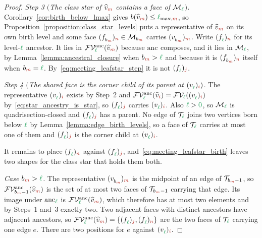 \documentclass[a4paper, 12pt]{article}
\newcommand{\lmaxIdx}[1]{\l_{\max,#1}}
\newcommand{\green}{\color{ForestGreen}}
\newcommand{\brickred}{\color{BrickRed}}
\newcommand{\T}{\mathcal{T}}
\newcommand{\V}{\mathcal{V}}
\newcommand{\F}{\mathcal{F}}
\newcommand{\vertex}[2]{\freeQ{v}{}{#1}{#2}}
\newcommand{\vertexClass}[1]{\widehat{v}_{#1}}
\newcommand{\face}[2]{\freeQ{f}{}{#1}{#2}}
\newcommand{\FVl}[1]{\F\V_{#1}}
\newcommand{\coarseIdxone}{{\brickred i}}
\newcommand{\coarseIdxtwo}{{\brickred m}}
\newcommand{\fineIdxone}{{\brickred j}}
\newcommand{\fineIdxtwo}{{\brickred n}}
\renewcommand{\l}{{\green\ell}}
\newcommand{\lzero}{{\green 0}}
\newcommand{\freeQ}[4]{ ( {#1}^{#2}_{#3} )_{#4}}
\newcommand{\M}{\mathcal{M}}
\theoremstyle{definition}
\theoremstyle{plain}
\numberwithin{equation}{section}
\newcommand{\birthLevel}{b}
\newcommand{\anc}[1]{\mathrm{anc}_{#1}}                     %
\newcommand{\FVanc}[1]{\F\V^{\mathrm{anc}}_{#1}}            %
\begin{document}
\begin{proof}
    \emph{Step 3 $($The class star of $\vertexClass{\coarseIdxtwo}$ contains a face of $\M_\l$$)$.} Corollary~\ref{cor:birth_below_lmax} gives $\birthLevel(\vertexClass{\coarseIdxtwo}) \leq \lmaxIdx{\coarseIdxtwo}$, so Proposition~\ref{proposition:class_star_levels} puts a representative of $\vertexClass{\coarseIdxtwo}$ on its own birth level and some face $\face{b_\coarseIdxtwo}{\fineIdxtwo} \in \M_{b_\coarseIdxtwo}$ carries $\vertex{b_\coarseIdxtwo}{\coarseIdxtwo}$. Write $\face{\l}{\fineIdxtwo}$ for its level-$\l$ ancestor. It lies in $\FVanc{\l}(\vertexClass{\coarseIdxtwo})$ because $\anc{}$ composes, and it lies in $\M_\l$, by Lemma~\ref{lemma:ancestral_closure} when $b_\coarseIdxtwo > \l$ and because it is $\face{b_\coarseIdxtwo}{\fineIdxtwo}$ itself when $b_\coarseIdxtwo = \l$. By~\eqref{eq:meeting_leafstar_step} it is not $\face{\l}{\fineIdxone}$.

    \emph{Step 4 $($The shared face is the corner child of its parent at $\vertex{\l}{\coarseIdxone})$.} The representative $\vertex{\l}{\coarseIdxone}$ exists by Step~2 and $\FVanc{\l}(\vertexClass{\coarseIdxone}) = \FVl{\l}(\vertex{\l}{\coarseIdxone})$ by~\eqref{eq:star_ancestry_is_star}, so $\face{\l}{\fineIdxone}$ carries $\vertex{\l}{\coarseIdxone}$. Also $\l > \lzero$, so $\M_\l$ is quadrisection-closed and $\face{\l}{\fineIdxone}$ has a parent. No edge of $\T_\l$ joins two vertices born below $\l$ by Lemma~\ref{lemma:edge_birth_levels}, so a face of $\T_\l$ carries at most one of them and $\face{\l}{\fineIdxone}$ is the corner child at $\vertex{\l}{\coarseIdxone}$.

    It remains to place $\face{\l}{\fineIdxtwo}$ against $\face{\l}{\fineIdxone}$, and~\eqref{eq:meeting_leafstar_birth} leaves two shapes for the class star that holds them both.

    \emph{Case $b_\coarseIdxtwo > \l$.} The representative $\vertex{b_\coarseIdxtwo}{\coarseIdxtwo}$ is the midpoint of an edge of $\T_{b_\coarseIdxtwo-1}$, so $\FVanc{b_\coarseIdxtwo-1}(\vertexClass{\coarseIdxtwo})$ is the set of at most two faces of $\T_{b_\coarseIdxtwo-1}$ carrying that edge. Its image under $\anc{\l}$ is $\FVanc{\l}(\vertexClass{\coarseIdxtwo})$, which therefore has at most two elements and by Steps~1 and~3 exactly two. Two adjacent faces with distinct ancestors have adjacent ancestors, so $\FVanc{\l}(\vertexClass{\coarseIdxtwo}) = \{ \face{\l}{\fineIdxone}, \face{\l}{\fineIdxtwo} \}$ are the two faces of $\T_\l$ carrying one edge $e$. There are two positions for $e$ against $\vertex{\l}{\coarseIdxone}$.


\end{proof}
\end{document}

